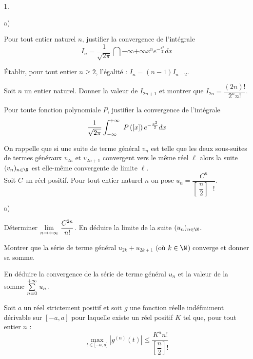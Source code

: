 \documentclass[11pt]{article}%
\begin{document}
\begin{noliste}{1.}
 \setlength{\itemsep}{4mm}
\item 

\begin{noliste}{a)}
 \setlength{\itemsep}{2mm}
\item Pour tout entier naturel $n$, justifier la convergence de
l'intégrale 
\[
I_{n} = {\dfrac{1}{\sqrt{2\pi }}}\dint{-\infty }{+ \infty
}x^{n}e^{-\frac{x^{2}}{2}}dx
\]

\item Établir, pour tout entier $n\geq 2$, l'égalité : $I_{n} =
(n-1)I_{n-2}$.

\item Soit $n$ un entier naturel. Donner la valeur de $I_{2n + 1}$ et
montrer
que $I_{2n} = \dfrac{(2n)!}{2^{n}n!}$.

\item Pour toute fonction polynomiale $P$, justifier la convergence de
l'intégrale 
\[
{\dfrac{1}{\sqrt{2\pi }}}\displaystyle \int_{-\infty }^{+ \infty
}\ P\left(\left[ {x} \right]\right)e^{-\frac{x^{2}}{2}}dx
\]
\end{noliste}

\item On rappelle que si une suite de terme général $v_{n}$ est telle
que
les deux sous-suites de termes généraux $v_{2n}$ et $v_{2n + 1}$
convergent
vers le même réel $\ell $ alors la suite $(v_{n})_{n\in \N}$ est
elle-même convergente de limite $\ell $.\\
Soit $C$ un réel positif. Pour tout entier naturel $n$ on pose $u_{n} =
\dfrac{C^{n}}{\left[ \ \dfrac{n}{2}\right] \text{ }!}$.

\begin{noliste}{a)}
 \setlength{\itemsep}{2mm}
\item Déterminer ${\displaystyle \lim_{n\rightarrow + \infty } \ }{\dfrac{C^{2n}}{n!}}$.
En déduire la limite de la suite $(u_{n})_{n\in \N}$.

\item Montrer que la série de terme général $u_{2k} + u_{2k + 1}$ (o{ù}
$k\in 
\N$) converge et donner sa somme.

\item En déduire la convergence de la série de terme général $u_{n}$ et
la
valeur de la somme ${\textstyle\sum\limits_{n = 0}^{+ \infty }}\hspace{.1cm}u_{n}$.
\end{noliste}

\item Soit $a$ un réel strictement positif et soit $g$ une fonction
réelle
indéfiniment dérivable sur $[-a,a]$ pour laquelle existe un réel
positif $K$
tel que, pour tout entier $n$ : 
\[
\max_{t\in \lbrack -a,a]}|g^{(n)}(t)|\leq {\dfrac{K^{n}n!}{\left[ 
\dfrac{n}{2}\right] !}}
\]


\end{noliste}
\end{document}
